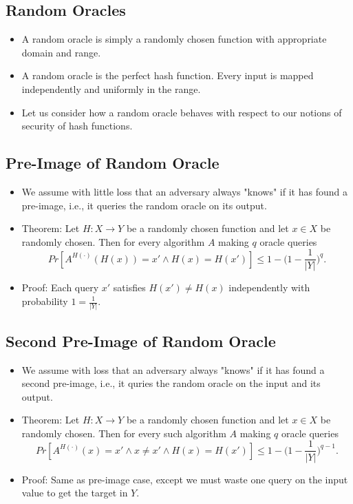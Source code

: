 \documentclass[a4paper]{scrartcl}
\begin{document}
\subsection*{Random Oracles}

\begin{itemize}
\item A random oracle is simply a randomly chosen function with appropriate domain and range.
\item A random oracle is the perfect hash function. Every input is mapped independently and uniformly in the range.
\item Let us consider how a random oracle behaves with respect to our notions of security of hash functions.
\end{itemize}

\subsection*{Pre-Image of Random Oracle}

\begin{itemize}
\item We assume with little loss that an adversary always "knows" if it has found a pre-image, i.e., it queries the random oracle on its output. 
\item Theorem: Let $H: X \rightarrow Y$ be a randomly chosen function and let $x \in X$ be randomly chosen. Then for every algorithm $A$ making $q$ oracle queries
$$Pr[A^{H(\cdot)}(H(x)) = x' \land H(x) = H(x')] \leq 1 - \bigg(1 - \frac{1}{|Y|} \bigg)^q .$$
\item Proof: Each query $x'$ satisfies $H(x') \neq H(x)$ independently with probability $1 = \frac{1}{|Y|}$.
\end{itemize}

\subsection*{Second Pre-Image of Random Oracle}

\begin{itemize}
\item We assume with loss that an adversary always "knows" if it has found a second pre-image, i.e., it quries the random oracle on the input and its output.
\item Theorem: Let $H: X \rightarrow Y$ be a randomly chosen function and let $x \in X$ be randomly chosen. Then for every such algorithm $A$ making $q$ oracle queries
$$Pr[A^{H(\cdot)}(x) = x' \land x \neq x' \land H(x) = H(x')] \leq 1 - \bigg(1 - \frac{1}{|Y|} \bigg)^{q-1} .$$
\item Proof: Same as pre-image case, except we must waste one query on the input value to get the target in $Y$.
\end{itemize}
\end{document}
